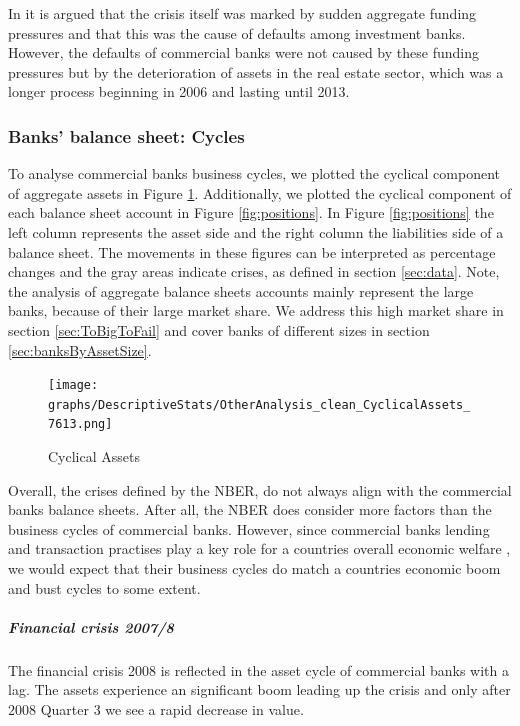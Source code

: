 \documentclass[12pt, a4paper]{article} %
\begin{document}
In \citet{antoniades2019commercial} it is argued that the crisis itself was marked by sudden aggregate funding pressures and that this was the cause of defaults among investment banks. However, the defaults of commercial banks were not caused by these funding pressures but by the deterioration of assets in the real estate sector, which was a longer process beginning in 2006 and lasting until 2013.
\fi




\subsubsection{Banks' balance sheet: Cycles}

To analyse commercial banks business cycles, we plotted the cyclical component of aggregate assets in Figure \ref{fig:cyclial_assets}. Additionally, we plotted the cyclical component of each balance sheet account in Figure \ref{fig:positions}. In Figure \ref{fig:positions} the left column represents the asset side and the right column the liabilities side of a balance sheet. The movements in these figures can be interpreted as percentage changes and the gray areas indicate crises, as defined in section \ref{sec:data}. Note, the analysis of aggregate balance sheets accounts mainly represent the large banks, because of their large market share. We address this high market share in section \ref{sec:ToBigToFail} and cover banks of different sizes in section \ref{sec:banksByAssetSize}.

\begin{figure}[H]
\begin{minipage}{\textwidth}
\texttt{[image: graphs/DescriptiveStats/OtherAnalysis\_clean\_CyclicalAssets\_7613.png]}
\caption[1]{Cyclical Assets}
\label{fig:cyclial_assets}
\end{minipage}
\end{figure}

Overall, the crises defined by the NBER, do not always align with the commercial banks balance sheets. After all, the NBER does consider more factors than the business cycles of commercial banks. However, since commercial banks lending and transaction practises play a key role for a countries overall economic welfare , we would expect that their business cycles do match a countries economic boom and bust cycles to some extent.


\subparagraph{Financial crisis 2007/8}
The financial crisis 2008 is reflected in the asset cycle of commercial banks with a lag. The assets experience an significant boom leading up the crisis and only after $2008$ Quarter 3 we see a rapid decrease in value.
\end{document}
